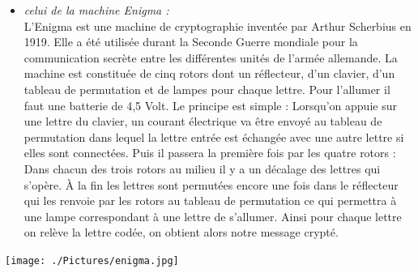 \documentclass[a4paper,12pt,abstracton,titlepage]{scrartcl}
\begin{document}
\begin{minipage}[t]{0.5\textwidth}
    \begin{itemize}
    \item \textit{celui de la machine Enigma :}\\
    L’Enigma est une machine de cryptographie inventée par Arthur Scherbius en 1919. Elle a été utilisée durant la Seconde Guerre mondiale pour la communication secrète entre les différentes unités de l’armée allemande.
La machine est constituée de cinq rotors dont un réflecteur, d’un clavier, d’un tableau de permutation et de lampes pour chaque lettre. Pour l’allumer il faut une batterie de 4,5 Volt.
Le principe est simple : Lorsqu’on appuie sur une lettre du clavier, un courant électrique va être envoyé au tableau de permutation dans lequel la lettre entrée est échangée avec une autre lettre si elles sont connectées. Puis il passera la première fois par les quatre rotors : Dans chacun des trois rotors au milieu il y a un décalage des lettres qui s’opère. À la fin les lettres sont permutées encore une fois dans le réflecteur qui les renvoie par les rotors au tableau de permutation ce qui permettra à une lampe correspondant à une lettre de s’allumer. Ainsi pour chaque lettre on relève la lettre codée, on obtient alors notre message crypté.\\
    \end{itemize}
  \end{minipage}
  \begin{minipage}[t]{0.5\linewidth}
    \raggedleft
    \strut\vspace*{-\baselineskip}\newline\newline\newline\texttt{[image: ./Pictures/enigma.jpg]}
    \label{enigma}
  \end{minipage}
  
\paragraph{}
\paragraph{}
\paragraph{}
\paragraph{}
\end{document}
